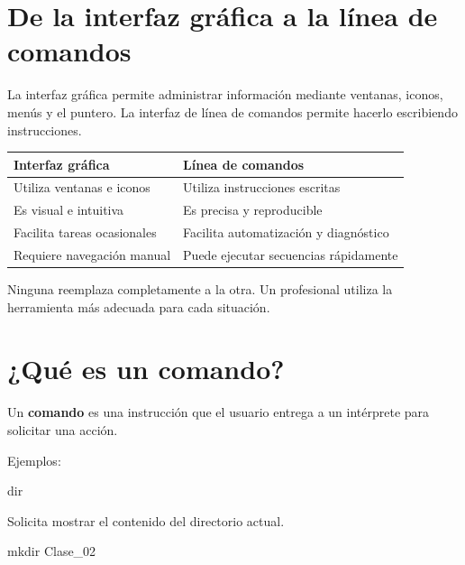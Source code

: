 \documentclass[
  spanish,
  letterpaper,
]{scrbook}
\newenvironment{Shaded}{\begin{snugshade}}{\end{snugshade}}
\newcommand{\BuiltInTok}[1]{\textcolor[rgb]{0.00,0.23,0.31}{#1}}
\newcommand{\NormalTok}[1]{\textcolor[rgb]{0.00,0.23,0.31}{#1}}
\newcounter{none} %
\begin{document}

\chapter{De la interfaz gráfica a la línea de
comandos}\label{de-la-interfaz-gruxe1fica-a-la-luxednea-de-comandos}

La interfaz gráfica permite administrar información mediante ventanas,
iconos, menús y el puntero. La interfaz de línea de comandos permite
hacerlo escribiendo instrucciones.

{\def\LTcaptype{none} %
\begin{longtable}[]{@{}ll@{}}
\toprule\noalign{}
Interfaz gráfica & Línea de comandos \\
\midrule\noalign{}
\endhead
\bottomrule\noalign{}
\endlastfoot
Utiliza ventanas e iconos & Utiliza instrucciones escritas \\
Es visual e intuitiva & Es precisa y reproducible \\
Facilita tareas ocasionales & Facilita automatización y diagnóstico \\
Requiere navegación manual & Puede ejecutar secuencias rápidamente \\
\end{longtable}
}

Ninguna reemplaza completamente a la otra. Un profesional utiliza la
herramienta más adecuada para cada situación.


\chapter{¿Qué es un comando?}\label{quuxe9-es-un-comando}

Un \textbf{comando} es una instrucción que el usuario entrega a un
intérprete para solicitar una acción.

Ejemplos:

\begin{Shaded}
\begin{Highlighting}[]
\BuiltInTok{dir}
\end{Highlighting}
\end{Shaded}

Solicita mostrar el contenido del directorio actual.

\begin{Shaded}
\begin{Highlighting}[]
\BuiltInTok{mkdir}\NormalTok{ Clase\_02}
\end{Highlighting}
\end{Shaded}
\end{document}
